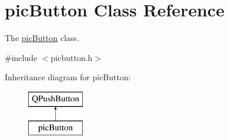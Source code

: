 \hypertarget{classpic_button}{}\section{pic\+Button Class Reference}
\label{classpic_button}


The \hyperlink{classpic_button}{pic\+Button} class.  




{\ttfamily \#include $<$picbutton.\+h$>$}

Inheritance diagram for pic\+Button\+:\begin{figure}[H]
\begin{center}
\leavevmode
\includegraphics[height=2.000000cm]{classpic_button}
\end{center}
\end{figure}
